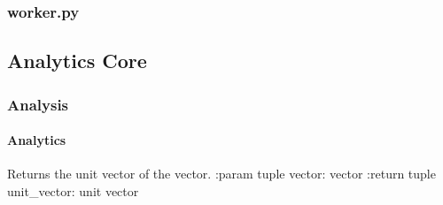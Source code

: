 \documentclass[letterpaper,10pt,english]{sphinxmanual}
\begin{document}
\subsubsection{worker.py}
\label{\detokenize{_autosummary/report_manager:worker-py}}

\subsection{Analytics Core}
\label{\detokenize{_autosummary/analytics_core:analytics-core}}\label{\detokenize{_autosummary/analytics_core::doc}}

\subsubsection{Analysis}
\label{\detokenize{_autosummary/analytics_core.analytics:analysis}}\label{\detokenize{_autosummary/analytics_core.analytics::doc}}

\paragraph{Analytics}
\label{\detokenize{_autosummary/analytics_core.analytics:module-analytics_core.analytics.analytics}}\label{\detokenize{_autosummary/analytics_core.analytics:analytics}}

\begin{fulllineitems}
\label{\detokenize{_autosummary/analytics_core.analytics:analytics_core.analytics.analytics.unit_vector}}
Returns the unit vector of the vector.
:param tuple vector: vector
:return tuple unit\_vector: unit vector

\end{fulllineitems}

\end{document}
